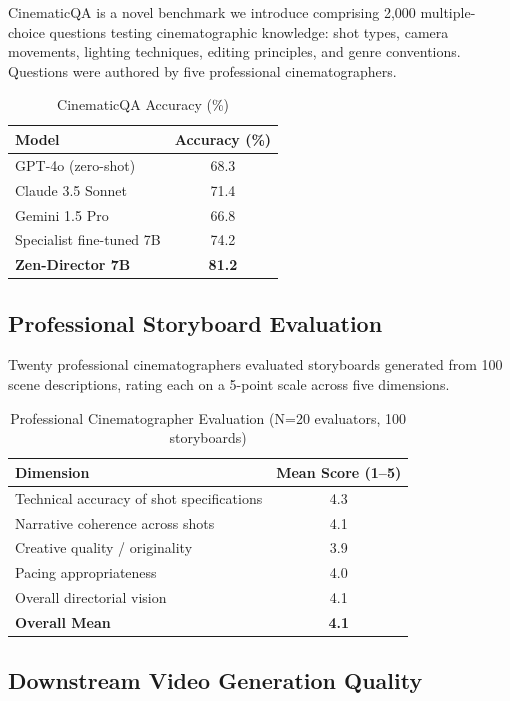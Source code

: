 \documentclass[11pt,a4paper]{article}
\begin{document}
CinematicQA is a novel benchmark we introduce comprising 2,000 multiple-choice questions
testing cinematographic knowledge: shot types, camera movements, lighting techniques, editing
principles, and genre conventions. Questions were authored by five professional cinematographers.

\begin{table}[H]
\centering
\begin{tabular}{lc}
\toprule
\textbf{Model} & \textbf{Accuracy (\%)} \\
\midrule
GPT-4o (zero-shot) & 68.3 \\
Claude 3.5 Sonnet & 71.4 \\
Gemini 1.5 Pro & 66.8 \\
Specialist fine-tuned 7B & 74.2 \\
\textbf{Zen-Director 7B} & \textbf{81.2} \\
\bottomrule
\end{tabular}
\caption{CinematicQA Accuracy (\%)}
\end{table}

\subsection{Professional Storyboard Evaluation}

Twenty professional cinematographers evaluated storyboards generated from 100 scene descriptions,
rating each on a 5-point scale across five dimensions.

\begin{table}[H]
\centering
\begin{tabular}{lc}
\toprule
\textbf{Dimension} & \textbf{Mean Score (1--5)} \\
\midrule
Technical accuracy of shot specifications & 4.3 \\
Narrative coherence across shots & 4.1 \\
Creative quality / originality & 3.9 \\
Pacing appropriateness & 4.0 \\
Overall directorial vision & 4.1 \\
\midrule
\textbf{Overall Mean} & \textbf{4.1} \\
\bottomrule
\end{tabular}
\caption{Professional Cinematographer Evaluation (N=20 evaluators, 100 storyboards)}
\end{table}

\subsection{Downstream Video Generation Quality}
\end{document}
